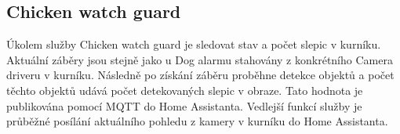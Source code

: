 
\subsection{Chicken watch guard}\label{subsec:chicken-watch-guard}
Úkolem služby Chicken watch guard je sledovat stav a počet slepic v kurníku.\newline
Aktuální záběry jsou stejně jako u Dog alarmu stahovány z konkrétního Camera driveru v kurníku.
Následně po získání záběru proběhne detekce objektů a počet těchto objektů udává počet detekovaných slepic v obraze.
Tato hodnota je publikována pomocí MQTT do Home Assistanta.
Vedlejší funkcí služby je průběžné posílání aktuálního pohledu z kamery v kurníku do Home Assistanta.